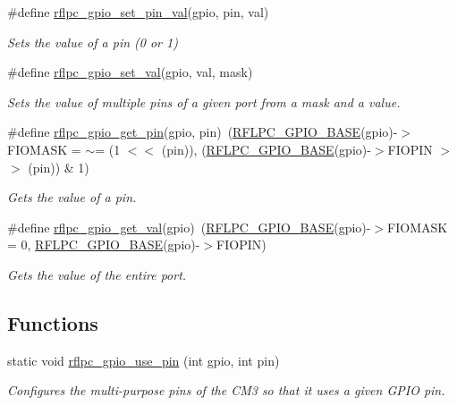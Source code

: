 \begin{DoxyCompactItemize}
\#define \hyperlink{group__gpio_ga30bc67d5a8c99ac9146b53817fac6ce3}{rflpc\-\_\-gpio\-\_\-set\-\_\-pin\-\_\-val}(gpio, pin, val)
\begin{DoxyCompactList}\small\item\em Sets the value of a pin (0 or 1) \end{DoxyCompactList}\item 
\#define \hyperlink{group__gpio_ga8b76b243597a46c35ac3f31ab71590e9}{rflpc\-\_\-gpio\-\_\-set\-\_\-val}(gpio, val, mask)
\begin{DoxyCompactList}\small\item\em Sets the value of multiple pins of a given port from a mask and a value. \end{DoxyCompactList}\item 
\hypertarget{group__gpio_gae58db90c4c5ca13f5aa85075d133d609}{\#define \hyperlink{group__gpio_gae58db90c4c5ca13f5aa85075d133d609}{rflpc\-\_\-gpio\-\_\-get\-\_\-pin}(gpio, pin)~(\hyperlink{group__gpio_ga77a6978d3b35080d5c7712e376e94932}{R\-F\-L\-P\-C\-\_\-\-G\-P\-I\-O\-\_\-\-B\-A\-S\-E}(gpio)-\/$>$F\-I\-O\-M\-A\-S\-K = $\sim$= (1 $<$$<$ (pin)), (\hyperlink{group__gpio_ga77a6978d3b35080d5c7712e376e94932}{R\-F\-L\-P\-C\-\_\-\-G\-P\-I\-O\-\_\-\-B\-A\-S\-E}(gpio)-\/$>$F\-I\-O\-P\-I\-N $>$$>$ (pin)) \& 1)}\label{group__gpio_gae58db90c4c5ca13f5aa85075d133d609}

\begin{DoxyCompactList}\small\item\em Gets the value of a pin. \end{DoxyCompactList}\item 
\hypertarget{group__gpio_ga853dcfdb3881c55b5a75a2e5fdb6487f}{\#define \hyperlink{group__gpio_ga853dcfdb3881c55b5a75a2e5fdb6487f}{rflpc\-\_\-gpio\-\_\-get\-\_\-val}(gpio)~(\hyperlink{group__gpio_ga77a6978d3b35080d5c7712e376e94932}{R\-F\-L\-P\-C\-\_\-\-G\-P\-I\-O\-\_\-\-B\-A\-S\-E}(gpio)-\/$>$F\-I\-O\-M\-A\-S\-K = 0, \hyperlink{group__gpio_ga77a6978d3b35080d5c7712e376e94932}{R\-F\-L\-P\-C\-\_\-\-G\-P\-I\-O\-\_\-\-B\-A\-S\-E}(gpio)-\/$>$F\-I\-O\-P\-I\-N)}\label{group__gpio_ga853dcfdb3881c55b5a75a2e5fdb6487f}

\begin{DoxyCompactList}\small\item\em Gets the value of the entire port. \end{DoxyCompactList}\end{DoxyCompactItemize}
\subsection*{Functions}
\begin{DoxyCompactItemize}
\item 
static void \hyperlink{group__gpio_gae710c04d73fd0ccacc27175133f45bd1}{rflpc\-\_\-gpio\-\_\-use\-\_\-pin} (int gpio, int pin)
\begin{DoxyCompactList}\small\item\em Configures the multi-\/purpose pins of the C\-M3 so that it uses a given G\-P\-I\-O pin. \end{DoxyCompactList}\end{DoxyCompactItemize}


